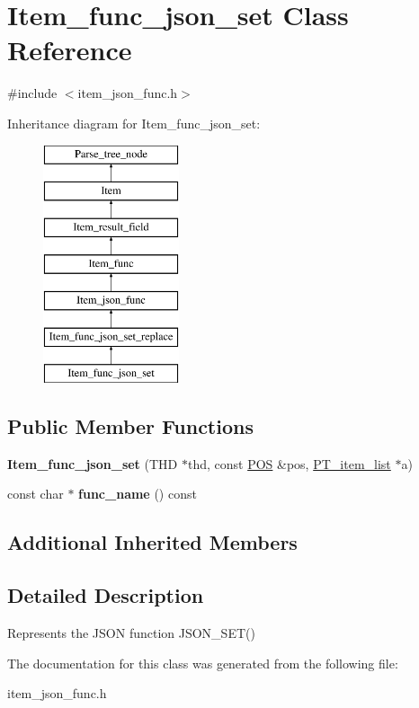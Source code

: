 \hypertarget{classItem__func__json__set}{}\section{Item\+\_\+func\+\_\+json\+\_\+set Class Reference}
\label{classItem__func__json__set}


{\ttfamily \#include $<$item\+\_\+json\+\_\+func.\+h$>$}

Inheritance diagram for Item\+\_\+func\+\_\+json\+\_\+set\+:\begin{figure}[H]
\begin{center}
\leavevmode
\includegraphics[height=7.000000cm]{classItem__func__json__set}
\end{center}
\end{figure}
\subsection*{Public Member Functions}
\begin{DoxyCompactItemize}
\item 
\mbox{\label{classItem__func__json__set_a6f0738d1461a34c54d7bda2e9e58b4bb}} 
{\bfseries Item\+\_\+func\+\_\+json\+\_\+set} (T\+HD $\ast$thd, const \mbox{\hyperlink{structYYLTYPE}{P\+OS}} \&pos, \mbox{\hyperlink{classPT__item__list}{P\+T\+\_\+item\+\_\+list}} $\ast$a)
\item 
\mbox{\label{classItem__func__json__set_a03217dc2625fb74e0da93dce578e3c3c}} 
const char $\ast$ {\bfseries func\+\_\+name} () const
\end{DoxyCompactItemize}
\subsection*{Additional Inherited Members}


\subsection{Detailed Description}
Represents the J\+S\+ON function J\+S\+O\+N\+\_\+\+S\+E\+T() 

The documentation for this class was generated from the following file\+:\begin{DoxyCompactItemize}
\item 
item\+\_\+json\+\_\+func.\+h\end{DoxyCompactItemize}
